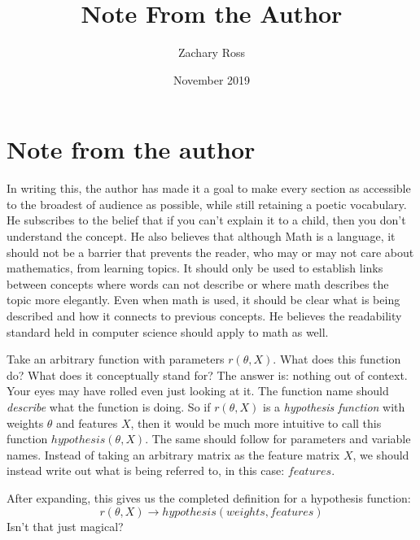 \documentclass{book}[a5paper]
\title{Note From the Author}
\author{Zachary Ross}
\date{November 2019}
\begin{document}
\chapter{Note from the author}

In writing this, the author has made it a goal to make every section as accessible to the broadest of audience as possible, while still retaining a poetic vocabulary. He subscribes to the belief that if you can't explain it to a child, then you don't understand the concept. He also believes that although Math is a language, it should not be a barrier that prevents the reader, who may or may not care about mathematics, from learning topics. It should only be used to establish  links between concepts where words can not describe or where math describes the topic more elegantly. Even when math is used, it should be clear what is being described and how it connects to previous concepts. He believes the readability standard held in computer science should apply to math as well.

Take an arbitrary function with parameters $r(\theta, X)$. What does this function do? What does it conceptually stand for? The answer is: nothing out of context. Your eyes may have rolled even just looking at it. The function name should \emph{describe} what the function is doing. So if $r(\theta, X)$ is a \emph{hypothesis function} with weights $\theta$ and features $X$, then it would be much more intuitive to call this function $hypothesis(\theta, X)$. The same should follow for parameters and variable names. Instead of taking an arbitrary matrix as the feature matrix $X$, we should instead write out what is being referred to, in this case: $features$.

After expanding, this gives us the completed definition for a hypothesis function:
\begin{equation}
    r(\theta, X) \rightarrow hypothesis(weights, features)
\end{equation}
Isn't that just magical?
\end{document}
